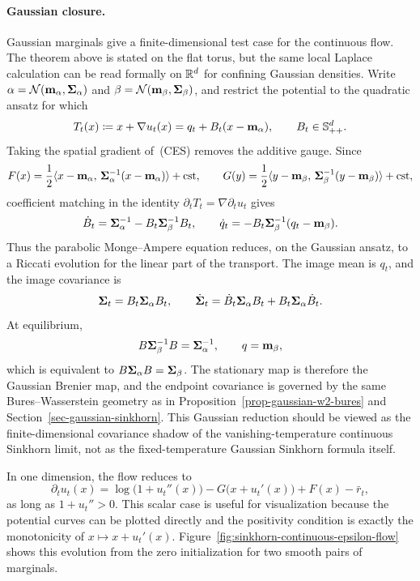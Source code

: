 \paragraph{Gaussian closure.}
Gaussian marginals give a finite-dimensional test case for the continuous flow.  The theorem above is stated on the flat torus, but the same local Laplace calculation can be read formally on \(\mathbb{R}^d\) for confining Gaussian densities.  Write
\(\alpha=\mathcal{N}(\mathbf{m}_\alpha,\mathbf{\Sigma}_\alpha)\) and \(\beta=\mathcal{N}(\mathbf{m}_\beta,\mathbf{\Sigma}_\beta)\), and restrict the potential to the quadratic ansatz for which
\[
	T_t(x)\coloneqq x+\nabla u_t(x)
	=
	q_t+B_t(x-\mathbf{m}_\alpha),
	\qquad B_t\in\mathbb S_{++}^d .
\]
Taking the spatial gradient of~\textup{(CES)} removes the additive gauge.  Since
\[
	F(x)=\frac12\langle x-\mathbf{m}_\alpha,\,\mathbf{\Sigma}_\alpha^{-1}(x-\mathbf{m}_\alpha)\rangle+\mathrm{cst},
	\qquad
	G(y)=\frac12\langle y-\mathbf{m}_\beta,\,\mathbf{\Sigma}_\beta^{-1}(y-\mathbf{m}_\beta)\rangle+\mathrm{cst},
\]
coefficient matching in the identity \(\partial_tT_t=\nabla\partial_tu_t\) gives
\[
	\dot B_t=\mathbf{\Sigma}_\alpha^{-1}-B_t\mathbf{\Sigma}_\beta^{-1}B_t,
	\qquad
	\dot q_t=-B_t\mathbf{\Sigma}_\beta^{-1}(q_t-\mathbf{m}_\beta).
\]
Thus the parabolic Monge--Ampere equation reduces, on the Gaussian ansatz, to a Riccati evolution for the linear part of the transport.  The image mean is \(q_t\), and the image covariance is
\[
	\mathbf{\Sigma}_t=B_t\mathbf{\Sigma}_\alpha B_t,
	\qquad
	\dot{\mathbf{\Sigma}}_t=\dot B_t\mathbf{\Sigma}_\alpha B_t+B_t\mathbf{\Sigma}_\alpha\dot B_t.
\]
At equilibrium,
\[
	B\mathbf{\Sigma}_\beta^{-1}B=\mathbf{\Sigma}_\alpha^{-1},
	\qquad q=\mathbf{m}_\beta,
\]
which is equivalent to \(B\mathbf{\Sigma}_\alpha B=\mathbf{\Sigma}_\beta\).  The stationary map is therefore the Gaussian Brenier map, and the endpoint covariance is governed by the same Bures--Wasserstein geometry as in Proposition~\ref{prop-gaussian-w2-bures} and Section~\ref{sec-gaussian-sinkhorn}.  This Gaussian reduction should be viewed as the finite-dimensional covariance shadow of the vanishing-temperature continuous Sinkhorn limit, not as the fixed-temperature Gaussian Sinkhorn formula itself.

In one dimension, the flow reduces to
\[
	\partial_t u_t(x)
	=
	\log\big(1+u_t''(x)\big)-G\big(x+u_t'(x)\big)+F(x)-\bar r_t,
\]
as long as $1+u_t''>0$.  This scalar case is useful for visualization because the potential curves can be plotted directly and the positivity condition is exactly the monotonicity of $x\mapsto x+u_t'(x)$.  Figure~\ref{fig:sinkhorn-continuous-epsilon-flow} shows this evolution from the zero initialization for two smooth pairs of marginals.


